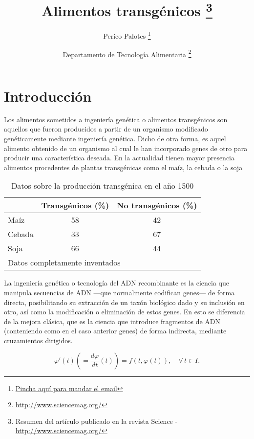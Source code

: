 \documentclass[11pt,a4paper]{article}
\title{Alimentos transgénicos
\thanks{Resumen del artículo publicado en la revista Science - 
\href{http://www.sciencemag.org/}{http://www.sciencemag.org/}}}
\author{Perico Palotes
\thanks{\href{mailto:perico.palotes@us.es}{Pincha aquí para mandar el email}}}
\date{Departamento de Tecnología Alimentaria
\thanks{\url{http://www.sciencemag.org/}}}
\begin{document}
\maketitle


\tableofcontents

\newpage 


\parskip5mm
\section{Introducción}

Los alimentos sometidos a ingeniería genética o alimentos transgénicos son aquellos que fueron producidos a partir de un organismo modificado genéticamente mediante ingeniería genética. Dicho de otra forma, es aquel alimento obtenido de un organismo al cual le han incorporado genes de otro para producir una característica deseada. En la actualidad tienen mayor presencia alimentos procedentes de plantas transgénicas como el maíz, la cebada o la soja 




\begin{table}[h!]
\centering
\begin{tabular}{|l|c|c|}
\hline
     &  Transgénicos (\%)  & No transgénicos (\%)  \\
\hline\hline
Maíz  &    58  &   42 \\
\hline
Cebada &   33   &  67   \\
\hline
Soja   &  66   & 44 \\
\hline
\multicolumn{3}{l}{\footnotesize Datos completamente inventados}
\end{tabular}
\caption{Datos sobre la producción transgénica en el año 1500}
\label{tabla.transg}
\end{table}



La ingeniería genética o tecnología del ADN recombinante es la ciencia que manipula secuencias de ADN ---que normalmente codifican genes--- de forma directa, posibilitando su extracción de un taxón biológico dado y su inclusión en otro, así como la modificación o eliminación de estos genes. En esto se diferencia de la mejora clásica, que es la ciencia que introduce fragmentos de ADN (conteniendo como en el caso anterior genes) de forma indirecta, mediante cruzamientos dirigidos.\cite{brezis} 

\begin{equation}\label{edo3}
\varphi'(t)\left(=\frac{d\varphi}{dt}(t)\right)=f(t,\varphi(t)),\quad\forall\, t\in I.
\end{equation}
\end{document}
